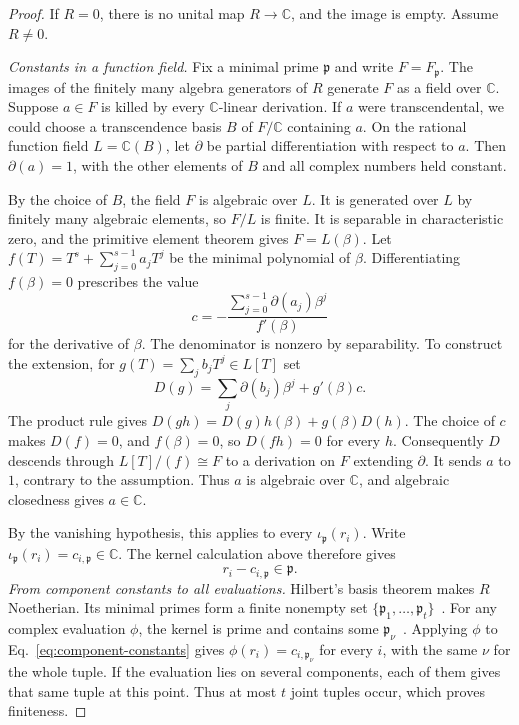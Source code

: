 \documentclass[aps,prl,reprint,notitlepage,nofootinbib,nobibnotes]{revtex4-2}
\begin{document}
\begin{proof}
If \(R=0\), there is no unital map \(R\to\mathbb C\), and the image
is empty. Assume \(R\ne0\).

\emph{Constants in a function field.}
Fix a minimal prime \(\mathfrak p\) and write \(F=F_{\mathfrak p}\).
The images of the finitely many algebra generators of \(R\) generate
\(F\) as a field over \(\mathbb C\). Suppose \(a\in F\) is killed by
every \(\mathbb C\)-linear derivation. If \(a\) were transcendental,
we could choose a transcendence basis \(B\) of \(F/\mathbb C\)
containing \(a\). On the rational function field \(L=\mathbb C(B)\),
let \(\partial\) be partial differentiation with respect to \(a\).
Then \(\partial(a)=1\), with the other elements of \(B\) and all
complex numbers held constant.

By the choice of \(B\), the field \(F\) is algebraic over \(L\).
It is generated over \(L\) by finitely many algebraic elements,
so \(F/L\) is finite. It is separable in characteristic zero, and
the primitive element theorem gives \(F=L(\beta)\). Let
\(f(T)=T^s+\sum_{j=0}^{s-1}a_jT^j\) be the minimal polynomial
of \(\beta\). Differentiating \(f(\beta)=0\) prescribes the value
\[
 c=-\frac{\sum_{j=0}^{s-1}\partial(a_j)\beta^j}{f'(\beta)}
\]
for the derivative of \(\beta\). The denominator is nonzero by
separability. To construct the extension, for
\(g(T)=\sum_j b_jT^j\in L[T]\) set
\[
 D(g)=\sum_j\partial(b_j)\beta^j+g'(\beta)c.
\]
The product rule gives
\(D(gh)=D(g)h(\beta)+g(\beta)D(h)\). The choice of \(c\) makes
\(D(f)=0\), and \(f(\beta)=0\), so \(D(fh)=0\) for every \(h\).
Consequently \(D\) descends through \(L[T]/(f)\cong F\) to a
derivation on \(F\) extending \(\partial\). It sends \(a\) to \(1\),
contrary to the assumption. Thus \(a\) is algebraic over
\(\mathbb C\), and algebraic closedness gives \(a\in\mathbb C\).

By the vanishing hypothesis, this applies to every
\(\iota_{\mathfrak p}(r_i)\). Write
\(\iota_{\mathfrak p}(r_i)=c_{i,\mathfrak p}\in\mathbb C\).
The kernel calculation above therefore gives
\begin{equation}\label{eq:component-constants}
 r_i-c_{i,\mathfrak p}\in\mathfrak p.
\end{equation}
\emph{From component constants to all evaluations.}
Hilbert's basis theorem makes \(R\) Noetherian. Its minimal primes
form a finite nonempty set
\(\{\mathfrak p_1,\ldots,\mathfrak p_t\}\)~\cite{Stacks}.
For any complex evaluation \(\phi\), the kernel is prime and
contains some \(\mathfrak p_\nu\)~\cite{Stacks}. Applying \(\phi\)
to Eq.~\eqref{eq:component-constants} gives
\(\phi(r_i)=c_{i,\mathfrak p_\nu}\) for every \(i\), with the same
\(\nu\) for the whole tuple. If the evaluation lies on several
components, each of them gives that same tuple at this point.
Thus at most \(t\) joint tuples occur, which proves finiteness.


\end{proof}
\end{document}
